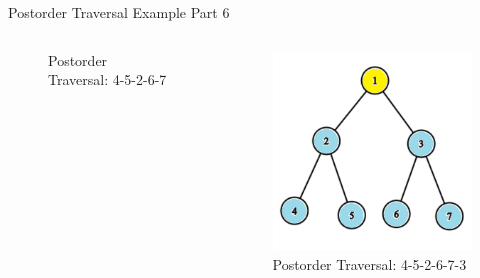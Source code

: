 \documentclass[aspectratio=169]{beamer}%
\begin{document}
\begin{frame}{Postorder Traversal Example Part 6}
\begin{columns}
\begin{column}{0.32\textwidth}
\begin{figure}
                \caption{Postorder Traversal: 4-5-2-6-7}
            \end{figure}
        \end{column}
        \hfill
        \begin{column}{0.32\textwidth}
            \begin{figure}
                \centering
                \includegraphics[width = .9\linewidth]{tree-post 18.png}
                \caption{Postorder Traversal: 4-5-2-6-7-3}
            \end{figure}
        \end{column}
    \end{columns}
\end{frame}
\end{document}
